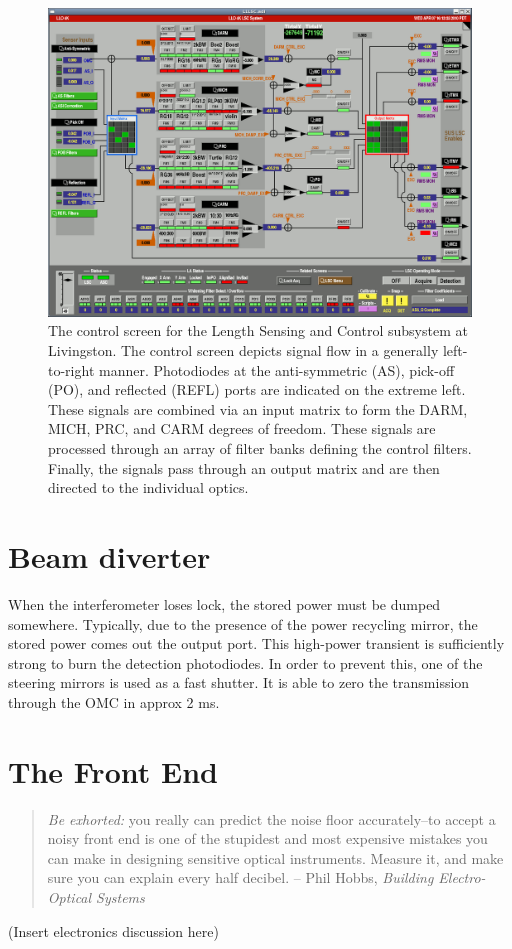\begin{figure}
\includegraphics[width=\columnwidth]{figures/L1LSC.png}
\caption[Length Sensing and Control (LSC) control screen]{The control screen for the Length Sensing and Control
  subsystem at Livingston.  The control screen depicts signal flow in
  a generally left-to-right manner.  Photodiodes at the anti-symmetric
  (AS), pick-off (PO), and reflected (REFL) ports are indicated on the
  extreme left.  These signals are combined via an input matrix to
  form the DARM, MICH, PRC, and CARM degrees of freedom.  These
  signals are processed through an array of filter banks defining the
  control filters.  Finally, the signals pass through an output matrix
  and are then directed to the individual optics.}
\end{figure}

\section{Beam diverter}

When the interferometer loses lock, the stored power must be dumped
somewhere. Typically, due to the presence of the power recycling mirror,
the stored power comes out the output port. This high-power transient
is sufficiently strong to burn the detection photodiodes. In order
to prevent this, one of the steering mirrors is used as a fast shutter.
It is able to zero the transmission through the OMC in approx 2 ms.

\section{The Front End}

\begin{quote}
\emph{Be exhorted:} you really can predict the noise floor accurately--to
accept a noisy front end is one of the stupidest and most expensive
mistakes you can make in designing sensitive optical
instruments. Measure it, and make sure you can explain every half
decibel. -- Phil Hobbs, \emph{Building Electro-Optical Systems} \cite{Hobbs2009Building}
\end{quote}

(Insert electronics discussion here)

